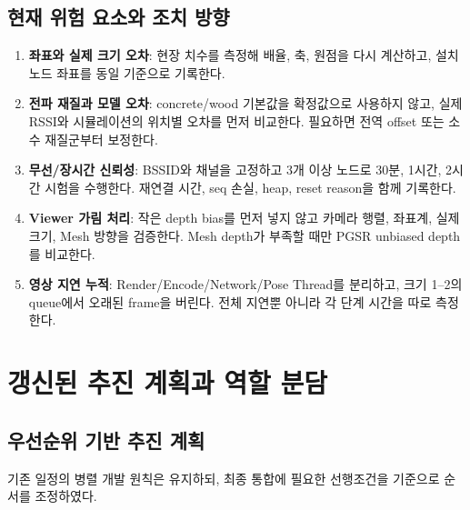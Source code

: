 \documentclass[titlepage]{pnureport}
\begin{document}
\section{현재 위험 요소와 조치 방향}

\begin{enumerate}
  \item \textbf{좌표와 실제 크기 오차}: 현장 치수를 측정해 배율, 축, 원점을 다시 계산하고, 설치 노드 좌표를 동일 기준으로 기록한다.
  \item \textbf{전파 재질과 모델 오차}: concrete/wood 기본값을 확정값으로 사용하지 않고, 실제 RSSI와 시뮬레이션의 위치별 오차를 먼저 비교한다. 필요하면 전역 offset 또는 소수 재질군부터 보정한다.
  \item \textbf{무선/장시간 신뢰성}: BSSID와 채널을 고정하고 3개 이상 노드로 30분, 1시간, 2시간 시험을 수행한다. 재연결 시간, seq 손실, heap, reset reason을 함께 기록한다.
  \item \textbf{Viewer 가림 처리}: 작은 depth bias를 먼저 넣지 않고 카메라 행렬, 좌표계, 실제 크기, Mesh 방향을 검증한다. Mesh depth가 부족할 때만 PGSR unbiased depth를 비교한다.
  \item \textbf{영상 지연 누적}: Render/Encode/Network/Pose Thread를 분리하고, 크기 1--2의 queue에서 오래된 frame을 버린다. 전체 지연뿐 아니라 각 단계 시간을 따로 측정한다.
\end{enumerate}

\chapter{갱신된 추진 계획과 역할 분담}

\section{우선순위 기반 추진 계획}

기존 일정의 병렬 개발 원칙은 유지하되, 최종 통합에 필요한 선행조건을 기준으로 순서를 조정하였다.
\end{document}
